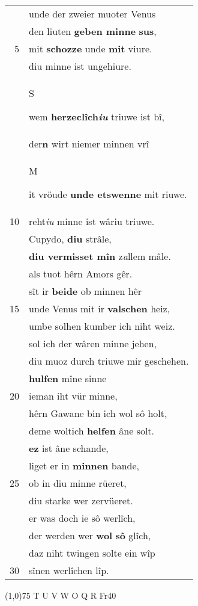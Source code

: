 \documentclass[8pt,a4paper,notitlepage]{article}
\begin{document}
\begin{table}[ht]
\begin{minipage}[t]{0.5\linewidth}
\begin{tabular}{rl}
 & unde der zweier muoter Venus\\ 
 & den liuten \textbf{geben minne} \textbf{sus},\\ 
5 & mit \textbf{schozze} unde \textbf{mit} viure.\\ 
 & diu minne ist ungehiure.\\ 
 & \begin{large}S\end{large}wem \textbf{herzeclîch\textit{iu}} triuwe ist bî,\\ 
 & der\textbf{n} wirt niemer minnen vrî\\ 
 & \begin{large}M\end{large}it vröude \textbf{unde etswenne} mit riuwe.\\ 
10 & reht\textit{iu} minne ist wâriu triuwe.\\ 
 & Cupydo, \textbf{diu} strâle,\\ 
 & \textbf{diu vermisset mîn} z\textit{a}llem mâle.\\ 
 & als tuot hêrn Amors gêr.\\ 
 & sît ir \textbf{beide} ob minnen hêr\\ 
15 & unde Venus mit ir \textbf{valschen} heiz,\\ 
 & umbe solhen kumber ich niht weiz.\\ 
 & sol ich der wâren minne jehen,\\ 
 & diu muoz durch triuwe mir geschehen.\\ 
 & \textbf{hulfen} mîne sinne\\ 
20 & ieman iht vür minne,\\ 
 & hêrn Gawane bin ich wol sô holt,\\ 
 & deme woltich \textbf{helfen} âne solt.\\ 
 & \textbf{ez} ist âne schande,\\ 
 & liget er in \textbf{minnen} bande,\\ 
25 & ob in diu minne rüeret,\\ 
 & diu starke wer zervüeret.\\ 
 & er was doch ie sô werlîch,\\ 
 & der werden wer \textbf{wol} \textbf{sô} glîch,\\ 
 & daz niht twingen solte ein wîp\\ 
30 & sînen werlîchen lîp.\\ 
\end{tabular}
\scriptsize
\line(1,0){75} \newline
T U V W O Q R Fr40 \newline

\end{minipage}
\end{table}
\end{document}
